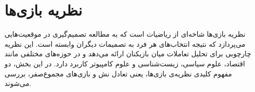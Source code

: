 \section
{
 نظریه بازی‌ها
}\label{sec:marl_games}
نظریه بازی‌ها شاخه‌ای از ریاضیات است که به مطالعه تصمیم‌گیری در موقعیت‌هایی می‌پردازد که نتیجه انتخاب‌های هر فرد به تصمیمات دیگران وابسته است. این نظریه چارچوبی برای تحلیل تعاملات میان بازیکنان ارائه می‌دهد و در حوزه‌های مختلفی مانند اقتصاد، علوم سیاسی، زیست‌شناسی و علوم کامپیوتر کاربرد دارد. 
در این بخش، دو مفهوم کلیدی نظریه‌ی بازی‌ها، یعنی تعادل نش و بازی‌های مجموع‌صفر، بررسی می‌شوند.